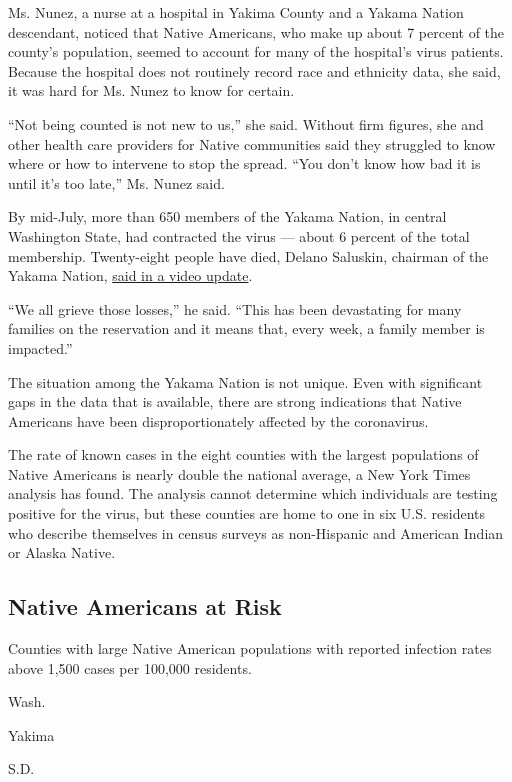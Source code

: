 Ms. Nunez, a nurse at a hospital in Yakima County and a Yakama Nation
descendant, noticed that Native Americans, who make up about 7 percent
of the county's population, seemed to account for many of the hospital's
virus patients. Because the hospital does not routinely record race and
ethnicity data, she said, it was hard for Ms. Nunez to know for certain.

``Not being counted is not new to us,'' she said. Without firm figures,
she and other health care providers for Native communities said they
struggled to know where or how to intervene to stop the spread. ``You
don't know how bad it is until it's too late,'' Ms. Nunez said.

By mid-July, more than 650 members of the Yakama Nation, in central
Washington State, had contracted the virus --- about 6 percent of the
total membership. Twenty-eight people have died, Delano Saluskin,
chairman of the Yakama Nation,
\href{https://www.facebookcorewwwi.onion/YakamaNationInfo/posts/2901001803343892}{said
in a video update}.

``We all grieve those losses,'' he said. ``This has been devastating for
many families on the reservation and it means that, every week, a family
member is impacted.''

The situation among the Yakama Nation is not unique. Even with
significant gaps in the data that is available, there are strong
indications that Native Americans have been disproportionately affected
by the coronavirus.

The rate of known cases in the eight counties with the largest
populations of Native Americans is nearly double the national average, a
New York Times analysis has found. The analysis cannot determine which
individuals are testing positive for the virus, but these counties are
home to one in six U.S. residents who describe themselves in census
surveys as non-Hispanic and American Indian or Alaska Native.

\hypertarget{native-americans-at-risk}{%
\subsection{Native Americans at Risk}\label{native-americans-at-risk}}

Counties with large Native American populations with reported infection
rates above 1,500 cases per 100,000 residents.

Wash.

Yakima

S.D.

